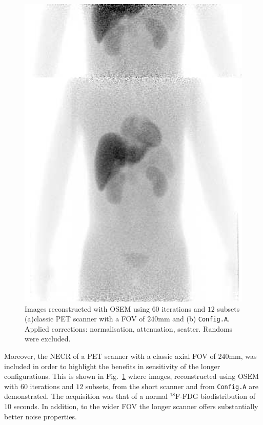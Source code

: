 \documentclass{IEEEtran}
\begin{document}
\begin{figure}
    \vspace{-0.2cm}
    
    \centering
    \includegraphics[width=0.85\linewidth]{recs.png}
    \caption{Images reconstructed with OSEM using $60$ iterations and $12$ subsets (a)classic PET scanner with a FOV of $240$mm and (b) \texttt{Config.A}. Applied corrections: normalisation, attenuation, scatter. Randoms were excluded.}
    \label{fig:recs}
    
    \vspace{-0.2cm}
\end{figure}

Moreover, the NECR of a PET scanner with a classic axial FOV of $240$mm, was included in order to highlight the benefits in sensitivity of the longer configurations. This is shown in Fig.~\ref{fig:recs} where images, reconstructed using OSEM with $60$ iterations and $12$ subsets, from the short scanner and from \texttt{Config.A} are demonstrated. The acquisition was that of a normal $^{18}$F-FDG biodistribution of $10$ seconds. In addition, to the wider FOV the longer scanner offers substantially better noise properties. 
\end{document}
